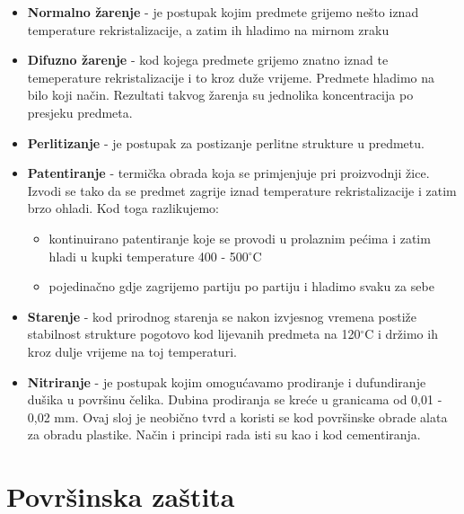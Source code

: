 \documentclass[a4paper,12pt]{article}
\numberwithin{figure}{section}
\begin{document}
\begin{itemize}
\item \textbf{Normalno žarenje} - je postupak kojim predmete grijemo nešto iznad temperature rekristalizacije, a zatim ih hladimo na mirnom zraku
\item \textbf{Difuzno žarenje} - kod kojega predmete grijemo znatno iznad te temeperature rekristalizacije i to kroz duže vrijeme. Predmete hladimo na bilo koji način. Rezultati takvog žarenja su jednolika koncentracija po presjeku predmeta.
\item \textbf{Perlitizanje} - je postupak za postizanje perlitne strukture u predmetu.
\item \textbf{Patentiranje} - termička obrada koja se primjenjuje pri proizvodnji žice. Izvodi se tako da se predmet zagrije iznad temperature rekristalizacije i zatim brzo ohladi. Kod toga razlikujemo:
\begin{itemize}
\item kontinuirano patentiranje koje se provodi u prolaznim pećima i zatim hladi u kupki temperature 400 - 500$^{\circ}$C
\item pojedinačno gdje zagrijemo partiju po partiju i hladimo svaku za sebe
\end{itemize}
\item \textbf{Starenje} - kod prirodnog starenja se nakon izvjesnog vremena postiže stabilnost strukture pogotovo kod lijevanih predmeta na 120$^{\circ}$C i držimo ih kroz dulje vrijeme na toj temperaturi.
\item \textbf{Nitriranje} - je postupak kojim omogućavamo prodiranje i dufundiranje dušika u površinu čelika. Dubina prodiranja se kreće u granicama od 0,01 - 0,02 mm. Ovaj sloj je neobično tvrd a koristi se kod površinske obrade alata za obradu plastike. Način i principi rada isti su kao i kod cementiranja.
\end{itemize}
\section{Površinska zaštita}
\end{document}
